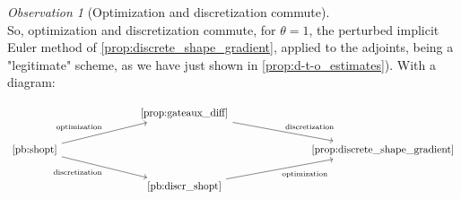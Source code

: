 \documentclass[english,a4paper,9pt,oneside]{scrbook}	%
\theoremstyle{break}
\theoremstyle{remark}
\newtheorem{obs}[equation]{Observation}
\begin{document}
\begin{obs}[Optimization and discretization commute]
\mbox{}\\
So, optimization and discretization commute, for $\theta=1$, the perturbed implicit Euler method of \cref{prop:discrete_shape_gradient}, applied to the adjoints, being a "legitimate" scheme, as we have just shown in \cref{prop:d-t-o_estimates}).
With a diagram:

\[\begin{tikzcd}
	&&& \text{\cref{prop:gateaux_diff}} \\
	\text{\cref{pb:shopt}} &&&&&& \text{\cref{prop:discrete_shape_gradient}}  \\
	&&& \text{\cref{pb:discr_shopt}} 
	\arrow["{\text{optimization}}"', from=3-4, to=2-7]
	\arrow["{\text{discretization}}", from=1-4, to=2-7]
	\arrow["{\text{optimization}}", from=2-1, to=1-4]
	\arrow["{\text{discretization}}"', from=2-1, to=3-4]
\end{tikzcd}\]


\end{obs}



\end{document}
